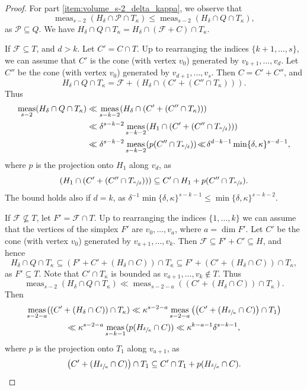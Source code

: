 \documentclass[JEP,XML,SOM,Unicode,published]{cedram}
\DeclareMathOperator{\meas}{meas}
\theoremstyle{definition}
\numberwithin{theorem}{section}
\begin{document}
\begin{proof}
For part \eqref{item:volume_s-2_delta_kappa}, we observe that
\[
\meas_{s-2}(H_\delta\cap \mathcal P \cap T_\kappa) \leq \meas_{s-2}(H_\delta\cap Q \cap T_\kappa),
\]
as $\mathcal P\subseteq Q$.
We have
$
H_\delta\cap Q\cap T_\kappa=H_\delta\cap (\mathcal F+C)\cap T_\kappa.
$

If $\mathcal F\subseteq T$, and $d>k$. Let $C'=C\cap T$. Up to rearranging the indices $\{k+1,\dots,s\}$, we can assume that $C'$ is the cone (with vertex $v_0$) generated by $v_{k+1},\dots,v_{d}$. Let $C''$ be the cone (with vertex $v_0$) generated by $v_{d+1},\dots,v_s$. Then $C=C'+C''$, and
\[
H_\delta\cap Q\cap T_\kappa=\mathcal F+(H_\delta\cap (C'+(C''\cap T_\kappa))).
\]
Thus
\begin{align*}
\meas_{s-2}(H_\delta\cap Q\cap T_\kappa)
&\ll\meas_{s-k-2}(H_\delta\cap (C'+(C''\cap T_\kappa)))\\
&\ll \delta^{s-k-2}\meas_{s-k-2}(H_1\cap (C'+(C''\cap T_{\sfrac{\kappa}{\delta}})))\\
&\ll \delta^{s-k-2}\meas_{s-k-2}(p(C''\cap T_{\sfrac{\kappa}{\delta}}))
\!\ll\! \delta^{d-k-1}\min\{\delta,\kappa\}^{s-d-1},
\end{align*}
where $p$ is the projection onto $H_1$ along $v_{d}$,
as \[
(H_1\cap (C'+(C''\cap T_{\sfrac{\kappa}{\delta}})))\subseteq C'\cap H_1+p(C''\cap T_{\sfrac{\kappa}{\delta}}).
\]
The bound holds also if $d=k$, as $\delta^{-1}\min\{\delta,\kappa\}^{s-k-1}\leq \min\{\delta,\kappa\}^{s-k-2}.$

If $\mathcal F\not\subseteq T$, let $F'=\mathcal F\cap T$. Up to rearranging the indices $\{1,\dots,k\}$ we can assume that the vertices of the simplex $F'$ are $v_0,\dots,v_a$, where $a=\dim F'$.
Let $C'$ be the cone (with vertex $v_0$) generated by $v_{a+1},\dots,v_k$.
Then $\mathcal F\subseteq F'+C'\subseteq H$, and hence
\[
H_\delta\cap Q\cap T_\kappa
\subseteq (F'+C'+(H_\delta\cap C))\cap T_\kappa
\subseteq F'+ (C'+(H_\delta\cap C))\cap T_\kappa,
\]
as $F'\subseteq T$. Note that $C'\cap T_\kappa$ is bounded as $v_{a+1},\dots,v_k\notin T$. Thus
\[
\meas_{s-2}(H_\delta\cap Q\cap T_\kappa)\ll\meas_{s-2-a}((C'+(H_\delta\cap C))\cap T_\kappa).
\]
Then
\begin{multline*}
\meas_{s-2-a}((C'+(H_\delta\cap C))\cap T_\kappa)
\ll \kappa^{s-2-a}\meas_{s-2-a}\left(\left(C'+(H_{{\sfrac \delta \kappa}}\cap C)\right)\cap T_1\right)\\
\ll \kappa^{s-2-a}\meas_{s-k-1}(p(H_{{\sfrac \delta \kappa}}\cap C))
\ll \kappa^{k-a-1}\delta^{s-k-1},
\end{multline*}
where $p$ is the projection onto $T_1$ along $v_{a+1}$,
as \[
\left(C'+(H_{{\sfrac \delta \kappa}}\cap C)\right)\cap T_1\subseteq C'\cap T_1+p(H_{{\sfrac \delta \kappa}}\cap C).
\]


\end{proof}
\end{document}
